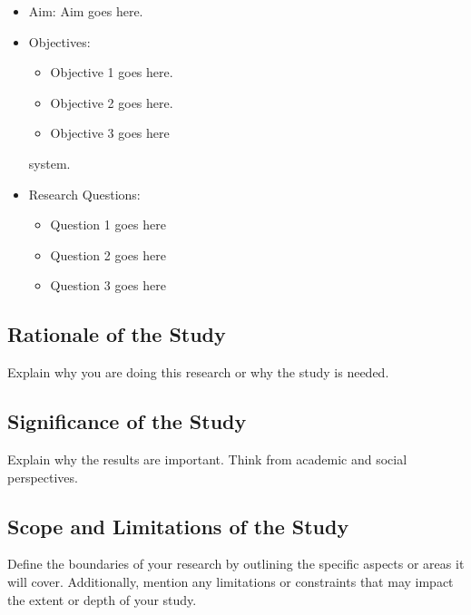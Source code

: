 \begin{itemize}
	\item Aim: Aim goes here.
	\item Objectives:
	\begin{itemize}
		\item Objective 1 goes here.
		\item Objective 2 goes here.
		\item Objective 3 goes here
	\end{itemize} system.
	\item Research Questions:
	\begin{itemize}
		\item Question 1 goes here
		\item Question 2 goes here
		\item Question 3 goes here
	\end{itemize}
\end{itemize}

\subsection{Rationale of the Study}
Explain why you are doing this research or why the study is needed.

\subsection{Significance of the Study}
Explain why the results are important. Think from academic and social perspectives. 

\subsection{Scope and Limitations of the Study}
Define the boundaries of your research by outlining the specific aspects or areas it will cover. Additionally, mention any limitations or constraints that may impact the extent or depth of your study.